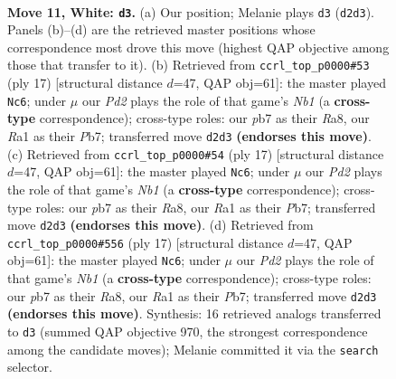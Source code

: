 \documentclass[11pt]{article}
\begin{document}
\clearpage

\begin{figure}[p]\centering
\begin{subfigure}{0.46\textwidth}\centering
\resizebox{\linewidth}{!}{%
\newchessgame
\chessboard[
  setfen={1rbq1rk1/pp3pbp/2n3p1/2pnp3/7P/4PNP1/PP1P1PB1/RNBQ1RK1 w - - 0 11},
  showmover=false,
  pgfstyle=straightmove, color=movearrow, markmove={d2-d3}
]}
\caption{}
\end{subfigure}\hfill
\begin{subfigure}{0.46\textwidth}\centering
\resizebox{\linewidth}{!}{%
\newchessgame
\chessboard[
  setfen={rnbq1rk1/1p2bppp/p2ppn2/8/2PNP3/2NBB3/PP3PPP/R2Q1RK1 b - - 4 9},
  showmover=false,
  pgfstyle=straightmove, color=movearrow, markmove={b8-c6}
]}
\caption{}
\end{subfigure}
\\[4pt]
\begin{subfigure}{0.46\textwidth}\centering
\resizebox{\linewidth}{!}{%
\newchessgame
\chessboard[
  setfen={rnbq1rk1/1p2bppp/p2ppn2/8/2PNP3/2NBB3/PP3PPP/R2Q1RK1 b - - 4 9},
  showmover=false,
  pgfstyle=straightmove, color=movearrow, markmove={b8-c6}
]}
\caption{}
\end{subfigure}\hfill
\begin{subfigure}{0.46\textwidth}\centering
\resizebox{\linewidth}{!}{%
\newchessgame
\chessboard[
  setfen={rnbq1rk1/1p2bppp/p2ppn2/8/2PNP3/2NBB3/PP3PPP/R2Q1RK1 b - - 4 9},
  showmover=false,
  pgfstyle=straightmove, color=movearrow, markmove={b8-c6}
]}
\caption{}
\end{subfigure}
\caption{\textbf{Move 11, White: \texttt{d3}.} (a) Our position; Melanie plays \texttt{d3} (\texttt{d2d3}). Panels (b)--(d) are the retrieved master positions whose correspondence most drove this move (highest QAP objective among those that transfer to it). (b) Retrieved from \texttt{ccrl\_top\_p0000\#53} (ply 17) [structural distance $d$=47, QAP obj=61]: the master played \texttt{Nc6}; under $\mu$ our \emph{Pd2} plays the role of that game's \emph{Nb1} (a \textbf{cross-type} correspondence); cross-type roles: our \emph{p}b7 as their \emph{R}a8, our \emph{R}a1 as their \emph{P}b7; transferred move \texttt{d2d3} \textbf{(endorses this move)}. (c) Retrieved from \texttt{ccrl\_top\_p0000\#54} (ply 17) [structural distance $d$=47, QAP obj=61]: the master played \texttt{Nc6}; under $\mu$ our \emph{Pd2} plays the role of that game's \emph{Nb1} (a \textbf{cross-type} correspondence); cross-type roles: our \emph{p}b7 as their \emph{R}a8, our \emph{R}a1 as their \emph{P}b7; transferred move \texttt{d2d3} \textbf{(endorses this move)}. (d) Retrieved from \texttt{ccrl\_top\_p0000\#556} (ply 17) [structural distance $d$=47, QAP obj=61]: the master played \texttt{Nc6}; under $\mu$ our \emph{Pd2} plays the role of that game's \emph{Nb1} (a \textbf{cross-type} correspondence); cross-type roles: our \emph{p}b7 as their \emph{R}a8, our \emph{R}a1 as their \emph{P}b7; transferred move \texttt{d2d3} \textbf{(endorses this move)}. Synthesis: 16 retrieved analogs transferred to \texttt{d3} (summed QAP objective 970, the strongest correspondence among the candidate moves); Melanie committed it via the \texttt{search} selector.}
\label{fig:thought-m20}
\end{figure}
\end{document}
